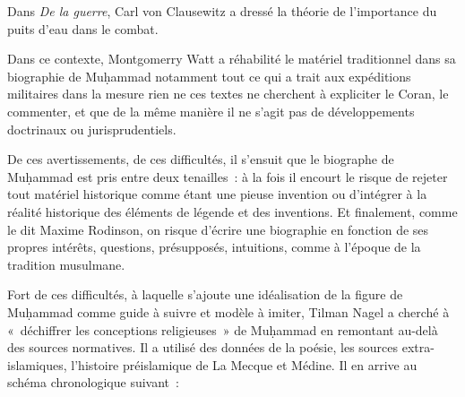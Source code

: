 \label{au-milieu-entre-les-combattants-de-leau-badr-est-le-nom-dun-puits-deau.-pour-muux1e25ammad-il-est-en-cela-un-lieu-stratuxe9gique-dans-la-mesure-ouxf9-la-caravane-devra-sy-arruxeater.}

Dans\textit{ De la guerre}, Carl von Clausewitz a dressé la théorie de
l'importance du puits d'eau dans le combat.

Dans ce contexte, Montgomerry Watt a réhabilité le matériel traditionnel
dans sa biographie de Muḥammad notamment tout ce qui a trait aux
expéditions militaires dans la mesure rien ne ces textes ne cherchent à
expliciter le Coran, le commenter, et que de la même manière il ne
s'agit pas de développements doctrinaux ou jurisprudentiels.

De ces avertissements, de ces difficultés, il s'ensuit que le biographe
de Muḥammad est pris entre deux tenailles~: à la fois il encourt le
risque de rejeter tout matériel historique comme étant une pieuse
invention ou d'intégrer à la réalité historique des éléments de légende
et des inventions. Et finalement, comme le dit Maxime Rodinson, on
risque d'écrire une biographie en fonction de ses propres intérêts,
questions, présupposés, intuitions, comme à l'époque de la tradition
musulmane.

Fort de ces difficultés, à laquelle s'ajoute une idéalisation de la
figure de Muḥammad comme guide à suivre et modèle à imiter, Tilman Nagel
a cherché à «~déchiffrer les conceptions religieuses~» de Muḥammad en
remontant au-delà des sources normatives. Il a utilisé des données de la
poésie, les sources extra-islamiques, l'histoire préislamique de La
Mecque et Médine. Il en arrive au schéma chronologique suivant~:

